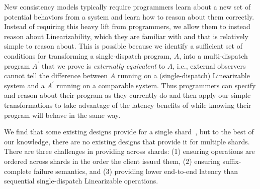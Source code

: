 
New consistency models typically require programmers learn about a new set of potential behaviors from a system and learn how to reason about them correctly.
Instead of requiring this heavy lift from programmers, we allow them to instead reason about Linearizability, which they are familiar with and that is relatively simple to reason about.
This is possible because we identify a sufficient set of conditions for transforming a single-dispatch program, $A$, into a multi-dispatch program $A^\prime$ that we prove is \textit{externally equivalent} to $A$, i.e., external observers cannot tell the difference between $A$ running on a (single-dispatch) Linearizable system and a $A^\prime$ running on a
comparable \mdl{} system.
Thus programmers can specify and reason about their program as they currently do and then apply our simple transformations to take advantage of the latency benefits of \mdl{} while knowing their program will behave in the same way.


We find that some existing designs provide \mdllong{} for a single shard~\cite{ongaro2014consensus}, but to the best of our knowledge, there are no existing designs that provide it for multiple shards.
There are three challenges in providing \mdl{} across shards:
(1) ensuring operations are ordered across shards in the order the client issued them,
(2) ensuring suffix-complete failure semantics,
and
(3) providing lower end-to-end latency than sequential single-dispatch Linearizable operations.

